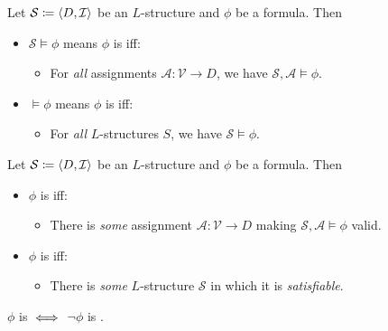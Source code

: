\begin{definition}[Validity]
    Let $\mathcal{S} \coloneqq \langle {D, \mathcal{I}} \rangle$ be an $L$-structure and $\phi$ be a
    formula. Then
    
    \begin{itemize}
        \item $\mathcal{S} \models \phi$ \quad means $\phi$ is  iff:
            \begin{itemize}
                \item For \textit{all} assignments $\mathcal{A} \colon \mathcal{V} \to D$,
                    we have $\mathcal{S}, \mathcal{A} \models \phi$.
            \end{itemize}
        \item $\models \phi$ \quad means $\phi$ is  iff:
            \begin{itemize}
                \item For \textit{all} $L$-structures $S$, we have 
                    $\mathcal{S} \models \phi$.
            \end{itemize}
    \end{itemize}
\end{definition}

\begin{definition}[Satisfiability]
    Let $\mathcal{S} \coloneqq \langle {D, \mathcal{I}} \rangle$ be an $L$-structure and $\phi$ be a
    formula. Then
    
    \begin{itemize}
        \item $\phi$ is  iff:
            \begin{itemize}
                \item There is \textit{some} assignment 
                    $\mathcal{A} \colon \mathcal{V} \to D$ making 
                    $\mathcal{S}, \mathcal{A} \models \phi$ valid.
            \end{itemize}
        \item $\phi$ is  iff:
            \begin{itemize}
                \item There is \textit{some} $L$-structure $\mathcal{S}$ in which
                    it is \textit{satisfiable}.
            \end{itemize}
    \end{itemize}
\end{definition}

\begin{remark}
    $\phi$ is  $\;\Longleftrightarrow\;$ $\neg \phi$ is .
\end{remark}
